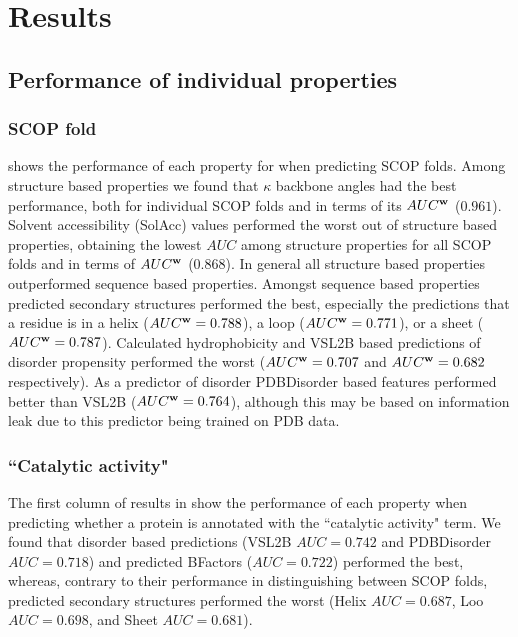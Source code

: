 \section{Results}

\subsection{Performance of individual properties}
\subsubsection{SCOP fold}

 shows the performance of each property for when predicting SCOP folds.  Among structure based properties we found that $\kappa$ backbone angles had the best performance, both for individual SCOP folds and in terms of its $AUC^{\bf{w}}$ ($0.961$).  Solvent accessibility (SolAcc) values performed the worst out of structure based properties, obtaining the lowest $AUC$ among structure properties for all SCOP folds and in terms of $AUC^{\bf{w}}$ ($0.868$). In general all structure based properties outperformed sequence based properties.  Amongst sequence based properties predicted secondary structures performed the best, especially the predictions that a residue is in a helix ($AUC^{\bf{w}}=0.788$), a loop ($AUC^{\bf{w}}=0.771$), or a sheet ($AUC^{\bf{w}}=0.787$).  Calculated hydrophobicity and VSL2B based predictions of disorder propensity performed the worst ($AUC^{\bf{w}}=0.707$ and $AUC^{\bf{w}}=0.682$ respectively).  As a predictor of disorder PDBDisorder based features performed better than VSL2B ($AUC^{\bf{w}}=0.764$), although this may be based on information leak due to this predictor being trained on PDB data.



\subsubsection{``Catalytic activity"}
The first column of results in  show the performance of each property when predicting whether a protein is annotated with the ``catalytic activity" term.  We found that disorder based predictions (VSL2B  $AUC=0.742$ and PDBDisorder $AUC=0.718$) and predicted BFactors ($AUC=0.722$) performed the best, whereas, contrary to their performance in distinguishing between SCOP folds, predicted secondary structures performed the worst (Helix $AUC=0.687$, Loo $AUC=0.698$, and Sheet $AUC=0.681$).

